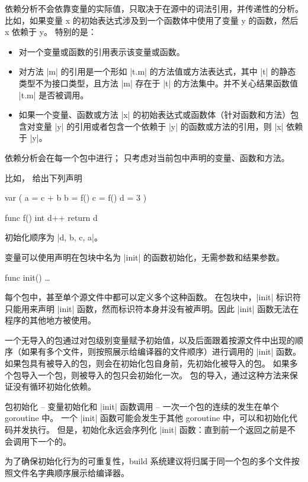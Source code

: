 依赖分析不会依靠变量的实际值，只取决于在源中的词法引用，并传递性的分析。
比如，如果变量 x 的初始表达式涉及到一个函数体中使用了变量 y 的函数，然后 x 依赖于 y。
特别的是：
\begin{itemize}
\item 对一个变量或函数的引用表示该变量或函数。
\item 对方法 \code|m| 的引用是一个形如 \code|t.m| 的方法值或方法表达式，其中 \code|t| 的静态类型不为接口类型，且方法 \code|m| 存在于 \code|t| 的方法集中。并不关心结果函数值 \code|t.m| 是否被调用。
\item 如果一个变量、函数或方法 \code|x| 的初始表达式或函数体（针对函数和方法）包含对变量 \code|y| 的引用或者包含一个依赖于 \code|y| 的函数或方法的引用，则 \code|x| 依赖于 \code|y|。
\end{itemize}
依赖分析会在每一个包中进行；
只考虑对当前包中声明的变量、函数和方法。

比如， 给出下列声明
\begin{golang}
var (
	a = c + b
	b = f()
	c = f()
	d = 3
)

func f() int {
	d++
	return d
}
\end{golang}
初始化顺序为 \code|d, b, c, a|。

变量可以使用声明在包块中名为 \code|init| 的函数初始化，无需参数和结果参数。
\begin{golang}
func init() { … }
\end{golang}

每个包中，甚至单个源文件中都可以定义多个这种函数。
在包块中，\code|init| 标识符只能用来声明 \code|init| 函数，然而标识符本身并没有被声明。因此 \code|init| 函数无法在程序的其他地方被使用。

一个无导入的包通过对包级别变量赋予初始值，以及后面跟着按源文件中出现的顺序（如果有多个文件，则按照展示给编译器的文件顺序）进行调用的 \code|init| 函数。
如果包具有被导入的包，则会在初始化包自身前，先初始化被导入的包。
如果多个包导入一个包，则被导入的包只会初始化一次。
包的导入，通过这种方法来保证没有循环初始化依赖。

包初始化 -- 变量初始化和 \code|init| 函数调用 -- 一次一个包的连续的发生在单个 goroutine 中。
一个 \code|init| 函数可能会发生于其他 goroutine 中，可以和初始化代码并发执行。
但是，初始化永远会序列化 \code|init| 函数：直到前一个返回之前是不会调用下一个的。

为了确保初始化行为的可重复性，build 系统建议将归属于同一个包的多个文件按照文件名字典顺序展示给编译器。

